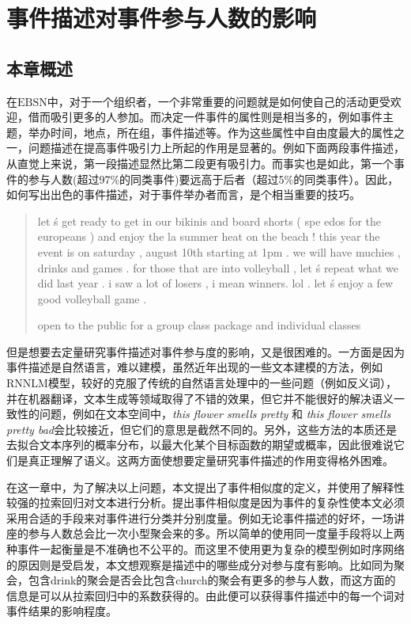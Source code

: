 % 
\section{事件描述对事件参与人数的影响} 
\subsection{本章概述} 
在$\mathrm{EBSN}$中，对于一个组织者，一个非常重要的问题就是如何使自己的活动更受欢迎，借而吸引更多的人参加。而决定一件事件的属性则是相当多的，例如事件主题，举办时间，地点，所在组，事件描述等。作为这些属性中自由度最大的属性之一，问题描述在提高事件吸引力上所起的作用是显著的。例如下面两段事件描述，从直觉上来说，第一段描述显然比第二段更有吸引力。而事实也是如此，第一个事件的参与人数(超过97\%的同类事件)要远高于后者（超过5\%的同类事件）。因此，如何写出出色的事件描述，对于事件举办者而言，是个相当重要的技巧。
 
\begin{quotation}
  let  \' s get ready to get in our bikinis and board shorts  (  spe
  edos for the europeans  )  and enjoy the la summer heat on the beach
  !  this year the event is on saturday  ,  august 10th starting at 
  1pm . we will have muchies  ,  drinks and games . for those that 
  are into volleyball  ,  let  \' s repeat what we did last year . 
  i saw a lot of losers  ,  i mean winners. lol . let  \' s enjoy 
  a few good volleyball game .
    
  open to the public for a group class package and individual classes
\end{quotation}

但是想要去定量研究事件描述对事件参与度的影响，又是很困难的。一方面是因为事件描述是自然语言，难以建模，虽然近年出现的一些文本建模的方法，例如RNNLM模型，较好的克服了传统的自然语言处理中的一些问题（例如反义词），并在机器翻译，文本生成等领域取得了不错的效果，但它并不能很好的解决语义一致性的问题，例如在文本空间中，\textit{this flower smells pretty} 和 \textit{this flower smells pretty bad}会比较接近，但它们的意思是截然不同的。另外，这些方法的本质还是去拟合文本序列的概率分布，以最大化某个目标函数的期望或概率，因此很难说它们是真正理解了语义。这两方面使想要定量研究事件描述的作用变得格外困难。

在这一章中，为了解决以上问题，本文提出了事件相似度的定义，并使用了解释性较强的拉索回归对文本进行分析。提出事件相似度是因为事件的复杂性使本文必须采用合适的手段来对事件进行分类并分别度量。例如无论事件描述的好坏，一场讲座的参与人数总会比一次小型聚会来的多。所以简单的使用同一度量手段将以上两种事件一起衡量是不准确也不公平的。而这里不使用更为复杂的模型例如时序网络的原因则是受\citep{noauthor_predicting_nodate}启发，本文想观察是描述中的哪些成分对参与度有影响。比如同为聚会，包含drink的聚会是否会比包含church的聚会有更多的参与人数，而这方面的信息是可以从拉索回归中的系数获得的。由此便可以获得事件描述中的每一个词对事件结果的影响程度。

